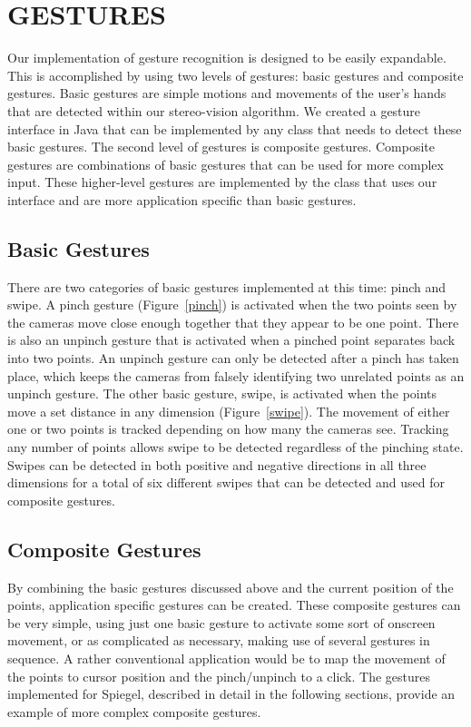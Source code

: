 \documentclass[a4paper,twoside]{article}
\begin{document}
\section{\uppercase{Gestures}} Our implementation of gesture recognition is
designed to be easily expandable. This is accomplished by using two levels of
gestures: basic gestures and composite gestures. Basic gestures are simple
motions and movements of the user's hands that are detected within our
stereo-vision algorithm. We created a gesture interface in Java that can be
implemented by any class that needs to detect these basic gestures. The second
level of gestures is composite gestures. Composite gestures are combinations of
basic gestures that can be used for more complex input. These higher-level
gestures are implemented by the class that uses our interface and are more
application specific than basic gestures.  \subsection{Basic Gestures} There
are two categories of basic gestures implemented at this time: pinch and swipe.
A pinch gesture (Figure~\ref{pinch}) is activated when the two points seen by
the cameras move close enough together that they appear to be one point. There
is also an unpinch gesture that is activated when a pinched point separates
back into two points. An unpinch gesture can only be detected after a pinch has
taken place, which keeps the cameras from falsely identifying two unrelated
points as an unpinch gesture. The other basic gesture, swipe, is activated when
the points move a set distance in any dimension (Figure~\ref{swipe}). The
movement of either one or two points is tracked depending on how many the
cameras see. Tracking any number of points allows swipe to be detected
regardless of the pinching state. Swipes can be detected in both positive and
negative directions in all three dimensions for a total of six different swipes
that can be detected and used for composite gestures.

\subsection{Composite Gestures} By combining the basic gestures discussed above
and the current position of the points, application specific gestures can be
created. These composite gestures can be very simple, using just one basic
gesture to activate some sort of onscreen movement, or as complicated as
necessary, making use of several gestures in sequence. A rather conventional
application would be to map the movement of the points to cursor position and
the pinch/unpinch to a click.  The gestures implemented for Spiegel, described
in detail in the following sections, provide an example of more complex
composite gestures. 
\end{document}
